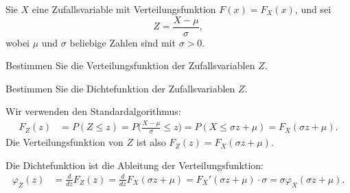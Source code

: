 Sie $X$ eine Zufallsvariable mit Verteilungsfunktion $F(x)=F_X(x)$, und
sei\[
Z=\frac{X-\mu}{\sigma},
\]
wobei $\mu$ und $\sigma$ beliebige Zahlen sind mit $\sigma > 0$.

\begin{teilaufgaben}
\item Bestimmen Sie die Verteilungsfunktion der Zufallsvariablen $Z$.
\item Bestimmen Sie die Dichtefunktion der Zufallsvariablen $Z$.
\end{teilaufgaben}

\begin{loesung}
\begin{teilaufgaben}
\item Wir verwenden den Standardalgorithmus:
\begin{align*}
F_Z(z)&=P(Z\le z)
=P\biggl(\frac{X-\mu}{\sigma}\le z\biggr)
=P(X\le \sigma z+\mu)=F_X(\sigma z+\mu).
\end{align*}
Die Verteilungsfunktion von $Z$ ist also $F_Z(z)=F_X(\sigma z+\mu)$.
\item Die Dichtefunktion ist die Ableitung der Verteilungsfunktion:
\begin{align*}
\varphi_Z(z)&=\frac{d}{dz}F_Z(z)
=\frac{d}{dz}F_X(\sigma z+ \mu)
=F_X'(\sigma z+ \mu)\cdot \sigma=\sigma\varphi_X(\sigma z+\mu).
\end{align*}
\end{teilaufgaben}
\end{loesung}

